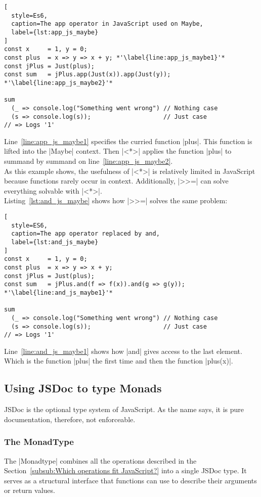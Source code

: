 \begin{lstlisting}[
  style=Es6,
  caption=The app operator in JavaScript used on Maybe,
  label={lst:app_js_maybe}
]
const x     = 1, y = 0;
const plus  = x => y => x + y; *'\label{line:app_js_maybe1}'*
const jPlus = Just(plus); 
const sum   = jPlus.app(Just(x)).app(Just(y)); *'\label{line:app_js_maybe2}'*

sum 
  (_ => console.log("Something went wrong") // Nothing case
  (s => console.log(s));                    // Just case 
// => Logs '1'
\end{lstlisting}

Line~\ref{line:app_js_maybe1} specifies the curried function |plus|. This
function is lifted into the |Maybe| context. Then |<*>| applies the function
|plus| to summand by summand on line~\ref{line:app_js_maybe2}.\\
As this example shows, the usefulness of |<*>| is relatively limited in
JavaScript because functions rarely occur in context. Additionally, |>>=| can
solve everything solvable with |<*>|. \\ 
Listing~\ref{lst:and_js_maybe} shows how |>>=| solves the same problem:

\begin{lstlisting}[
  style=ES6,
  caption=The app operator replaced by and,
  label={lst:and_js_maybe}
]
const x     = 1, y = 0;
const plus  = x => y => x + y; 
const jPlus = Just(plus); 
const sum   = jPlus.and(f => f(x)).and(g => g(y)); *'\label{line:and_js_maybe1}'*

sum 
  (_ => console.log("Something went wrong") // Nothing case
  (s => console.log(s));                    // Just case
// => Logs '1'
\end{lstlisting}
Line~\ref{line:and_js_maybe1} shows how |and| gives access to the last element.
Which is the function |plus| the first time and then the function |plus(x)|.

\subsection{Using JSDoc to type Monads} %
\label{sub:Using JSDoc to type monads}
JSDoc is the optional type system of JavaScript. As the name says, it is pure
documentation, therefore, not enforceable.

\subsubsection{The MonadType} %
\label{subsub:The MonadType}
The |Monadtype| combines all the operations described in the
Section~\ref{subsub:Which operations fit JavaScript?} into a single JSDoc type.
It serves as a structural interface that functions can use to describe their
arguments or return values.

